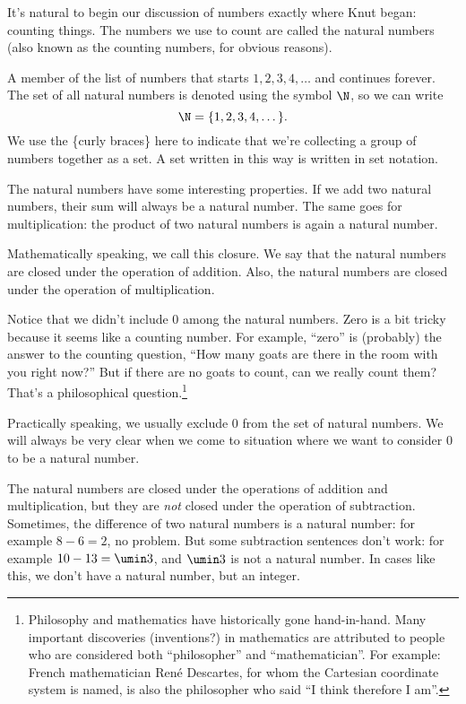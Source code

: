 It's natural to begin our discussion of numbers exactly where Knut began: counting things. The numbers we use to count are called the \glspl{natural number} (also known as the counting numbers, for obvious reasons).

\begin{boxdef}
A member of the list of numbers that starts $1, 2, 3, 4,\dotsc$ and continues forever. The set of all natural numbers is denoted using the symbol $\N$, so we can write \[\N = \{1, 2, 3, 4, \dotsc\}.\]
We use the \{curly braces\} here to indicate that we're collecting a group of numbers together as a \gls{set}. A set written in this way is written in \gls{set notation}.
\end{boxdef}

The natural numbers have some interesting properties. If we add two natural numbers, their sum will always be a natural number. The same goes for multiplication: the product of two natural numbers is again a natural number.

Mathematically speaking, we call this \gls{closure}. We say that the natural numbers are closed under the operation of addition. Also, the natural numbers are closed under the operation of multiplication.

Notice that we didn't include 0 among the natural numbers. Zero is a bit tricky because it seems like a counting number. For example, ``zero'' is (probably) the answer to the counting question, ``How many goats are there in the room with you right now?'' But if there are no goats to count, can we really count them? That's a philosophical question.\footnote{Philosophy and mathematics have historically gone hand-in-hand. Many important discoveries (inventions?) in mathematics are attributed to people who are considered both ``philosopher'' and ``mathematician''. For example: French mathematician Ren\'{e} Descartes, for whom the Cartesian coordinate system is named, is also the philosopher who said ``I think therefore I am''.}

Practically speaking, we usually exclude 0 from the set of natural numbers. We will always be very clear when we come to situation where we want to consider 0 to be a natural number.

The natural numbers are closed under the operations of addition and multiplication, but they are \textit{not} closed under the operation of subtraction. Sometimes, the difference of two natural numbers is a natural number: for example $8-6=2$, no problem. But some subtraction sentences don't work: for example $10-13 = \umin3$, and $\umin3$ is not a natural number. In cases like this, we don't have a natural number, but an \gls{integer}.

